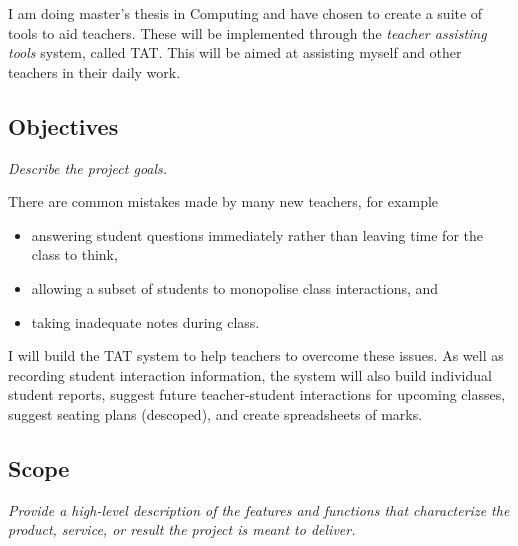 \documentclass[10pt]{article}
\begin{document}
I am doing master's thesis in Computing and have chosen to create a suite of tools to aid teachers. These will be implemented through the \emph{teacher assisting tools} system, called TAT. This will be aimed at assisting  myself and other teachers in their daily work.

\subsection{Objectives} 
\emph{Describe the project goals.}

There are common mistakes made by many new teachers, for example 
\begin{itemize}
\item answering student questions immediately rather than leaving time for the class to think,
\item allowing a subset of students to monopolise class interactions, and
\item taking inadequate notes during class.
\end{itemize}
I will build the TAT system to help teachers to overcome these issues. As well as recording student interaction information, the system will also build individual student reports, suggest future teacher-student interactions for upcoming classes, suggest seating plans (descoped), and create spreadsheets of marks.

\subsection{Scope} 
\emph{Provide a high-level description of the features and functions that characterize the product, service, or result the project is meant to deliver.}
\end{document}
